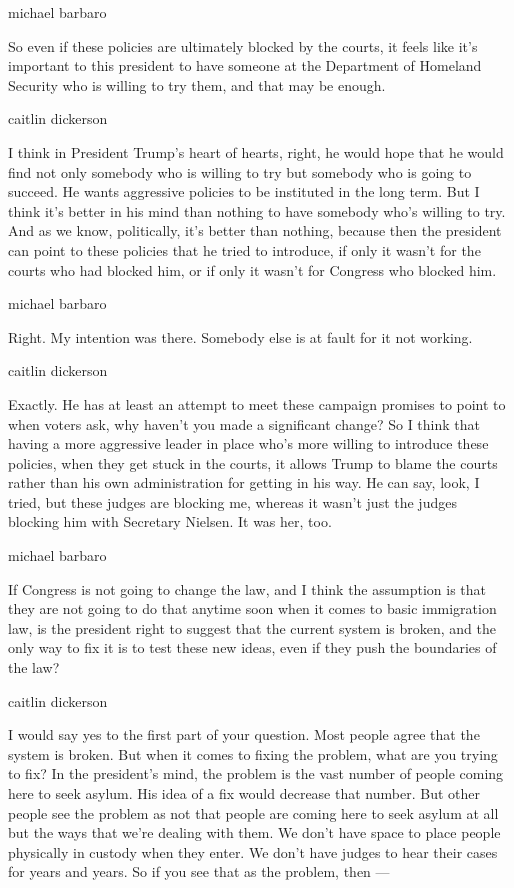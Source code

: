 michael barbaro

So even if these policies are ultimately blocked by the courts, it feels
like it's important to this president to have someone at the Department
of Homeland Security who is willing to try them, and that may be enough.

caitlin dickerson

I think in President Trump's heart of hearts, right, he would hope that
he would find not only somebody who is willing to try but somebody who
is going to succeed. He wants aggressive policies to be instituted in
the long term. But I think it's better in his mind than nothing to have
somebody who's willing to try. And as we know, politically, it's better
than nothing, because then the president can point to these policies
that he tried to introduce, if only it wasn't for the courts who had
blocked him, or if only it wasn't for Congress who blocked him.

michael barbaro

Right. My intention was there. Somebody else is at fault for it not
working.

caitlin dickerson

Exactly. He has at least an attempt to meet these campaign promises to
point to when voters ask, why haven't you made a significant change? So
I think that having a more aggressive leader in place who's more willing
to introduce these policies, when they get stuck in the courts, it
allows Trump to blame the courts rather than his own administration for
getting in his way. He can say, look, I tried, but these judges are
blocking me, whereas it wasn't just the judges blocking him with
Secretary Nielsen. It was her, too.

michael barbaro

If Congress is not going to change the law, and I think the assumption
is that they are not going to do that anytime soon when it comes to
basic immigration law, is the president right to suggest that the
current system is broken, and the only way to fix it is to test these
new ideas, even if they push the boundaries of the law?

caitlin dickerson

I would say yes to the first part of your question. Most people agree
that the system is broken. But when it comes to fixing the problem, what
are you trying to fix? In the president's mind, the problem is the vast
number of people coming here to seek asylum. His idea of a fix would
decrease that number. But other people see the problem as not that
people are coming here to seek asylum at all but the ways that we're
dealing with them. We don't have space to place people physically in
custody when they enter. We don't have judges to hear their cases for
years and years. So if you see that as the problem, then ---

